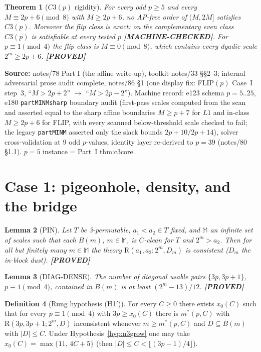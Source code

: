 \documentclass[11pt]{article}
\newtheorem{theorem}{Theorem}
\newtheorem{lemma}[theorem]{Lemma}
\theoremstyle{definition}
\newtheorem{definition}[theorem]{Definition}
\newcommand{\Rung}{\mathrm{R}}
\newcommand{\source}[1]{\par\smallskip\noindent\textbf{Source:} {#1}\par}
\newcommand{\status}[1]{\textbf{[#1]}}
\begin{document}
\begin{theorem}[$C3(p)$ rigidity]\label{thm:c3p}
For every odd $p \ge 5$ and every $M \equiv 2p+6 \pmod 8$ with
$M \ge 2p+6$, no AP-free order of $(M, 2M]$ satisfies $C3(p)$.  Moreover the
flip class is exact: on the complementary even class $C3(p)$ is satisfiable
at every tested $p$ \status{MACHINE-CHECKED}.  For $p \equiv 1 \pmod 4$ the
flip class is $M \equiv 0 \pmod 8$, which contains every dyadic scale
$2^m \ge 2p+6$.  \status{PROVED}
\end{theorem}

\source{notes/78 Part I (the affine write-up), toolkit notes/33 \S\S2--3;
internal adversarial prose audit complete, notes/86 \S1 (one display fix: FLIP$(p)$ Case~I
step~3, ``$M > 2p+2$'' $\to$ ``$M > 2p-2$'').  Machine record: e123 schema
$p = 5..25$, e180 \texttt{partMINMsharp} boundary audit (first-pass
scales computed from the scan and asserted equal to the sharp affine
boundaries $M \ge p+7$ for $L1$ and in-class $M \ge 2p+6$ for FLIP, with
every scanned below-threshold scale checked to fail; the legacy
\texttt{partMINM} asserted only the slack bounds $2p+10 / 2p+14$),
solver cross-validation at 9 odd
$p$-values, identity layer re-derived to $p = 39$ (notes/80 \S1.1).
$p = 5$ instance = Part~I thm:c3core.}

\section{Case 1: pigeonhole, density, and the bridge}\label{sec:case1}

\begin{lemma}[PIN]\label{lem:pin}
Let $T$ be 3-permutable, $a_1 < a_2 \in T$ fixed, and $\mathbb{M}$ an
infinite set of scales such that each $B(m)$, $m \in \mathbb{M}$, is
$C$-clean for $T$ and $2^m > a_2$.  Then for all but finitely many
$m \in \mathbb{M}$ the theory $\Rung(a_1, a_2; 2^m, D_m)$ is consistent
($D_m$ the in-block dust).  \status{PROVED}
\end{lemma}

\begin{lemma}[DIAG-DENSE]\label{lem:diagdense}
The number of diagonal usable pairs $\{3p, 3p+1\}$, $p \equiv 1 \pmod 4$,
contained in $B(m)$ is at least $(2^m - 13)/12$.  \status{PROVED}
\end{lemma}

\begin{definition}[Rung hypothesis (H1$'$)]\label{def:h1}
For every $C \ge 0$ there exists $x_0(C)$ such that for every
$p \equiv 1 \pmod 4$ with $3p \ge x_0(C)$ there is $m^*(p, C)$ with
$\Rung(3p, 3p+1; 2^m, D)$ inconsistent whenever $m \ge m^*(p, C)$ and
$D \subseteq B(m)$ with $|D| \le C$.  Under
Hypothesis~\ref{hyp:n3grow} one may take $x_0(C) = \max\{11,\, 4C+5\}$
(then $|D| \le C < \lfloor (3p-1)/4 \rfloor$).
\end{definition}
\end{document}

